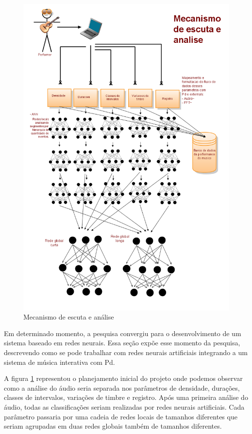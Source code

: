 \documentclass{ppgmus}
\begin{document}
\begin{figure}
\includegraphics[scale=.7]{escuta}
\caption{Mecanismo de escuta e análise}
\label{escuta}
\end{figure}



Em determinado momento, a pesquisa convergiu para o desenvolvimento de um sistema baseado em redes neurais.
Essa seção expõe esse momento da pesquisa, descrevendo como se pode trabalhar com redes neurais artificiais 
integrando a um sistema de música interativa com Pd.

A figura \ref{escuta} representou o planejamento inicial do projeto onde podemos observar como a 
análise do áudio seria separada nos parâmetros de
densidade, durações, classes de intervalos, variações de timbre e registro. Após uma primeira análise do
áudio, todas as classificações seriam realizadas por redes neurais artificiais. Cada parâmetro passaria
 por uma cadeia de redes locais de tamanhos diferentes que seriam agrupadas em duas 
redes globais também de tamanhos diferentes.
\end{document}
